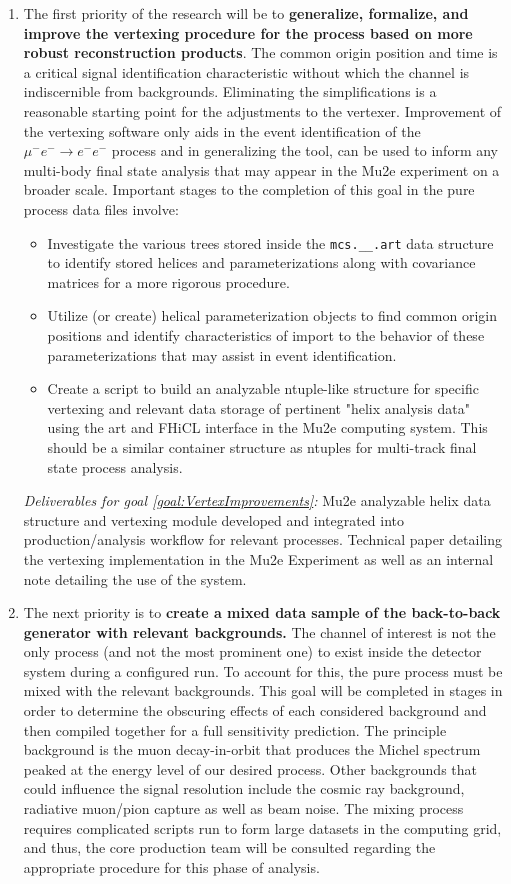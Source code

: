 \documentclass[12pt]{article}
\newcommand{\muEtoEE}{\mu^- e^- \to e^- e^-}
\begin{document}
\begin{enumerate}
    \item \label{goal:VertexImprovements}The first priority of the research will be to \textbf{generalize, formalize, and improve the vertexing procedure for the process based on more robust reconstruction products}. The common origin position and time is a critical signal identification characteristic without which the channel is indiscernible from backgrounds. Eliminating the simplifications is a reasonable starting point for the adjustments to the vertexer. Improvement of the vertexing software only aids in the event identification of the $\muEtoEE$ process and in generalizing the tool, can be used  to inform any multi-body final state analysis that may appear in the Mu2e experiment on a broader scale. Important stages to the completion of this goal in the pure process data files involve:
\begin{itemize}
    \item Investigate the various trees stored inside the \verb|mcs.__.art| data structure to identify stored helices and parameterizations along with covariance matrices for a more rigorous procedure.
    \item Utilize (or create) helical parameterization objects to find common origin positions and identify characteristics of import to the behavior of these parameterizations that may assist in event identification.
    \item Create a script to build an analyzable ntuple-like structure for specific vertexing and relevant data storage of pertinent "helix analysis data" using the art and FHiCL interface in the Mu2e computing system. This should be a similar container structure as ntuples for multi-track final state process analysis.
\end{itemize}
\textit{Deliverables for goal \ref{goal:VertexImprovements}:} Mu2e analyzable helix data structure and vertexing module developed and integrated into production/analysis workflow for relevant processes. Technical paper detailing the vertexing implementation in the Mu2e Experiment as well as an internal note detailing the use of the system.

\item \label{goal:Mixing}The next priority is to \textbf{create a mixed data sample of the back-to-back generator with relevant backgrounds.} The channel of interest is not the only process (and not the most prominent one) to exist inside the detector system during a configured run. To account for this, the pure process must be mixed with the relevant backgrounds. This goal will be completed in stages in order to determine the obscuring effects of each considered background and then compiled together for a full sensitivity prediction. The principle background is the muon decay-in-orbit that produces the Michel spectrum peaked at the energy level of our desired process. Other backgrounds that could influence the signal resolution include the cosmic ray background, radiative muon/pion capture as well as beam noise. The mixing process requires complicated scripts run to form large datasets in the computing grid, and thus, the core production team will be consulted regarding the appropriate procedure for this phase of analysis. 


\end{enumerate}
\end{document}
